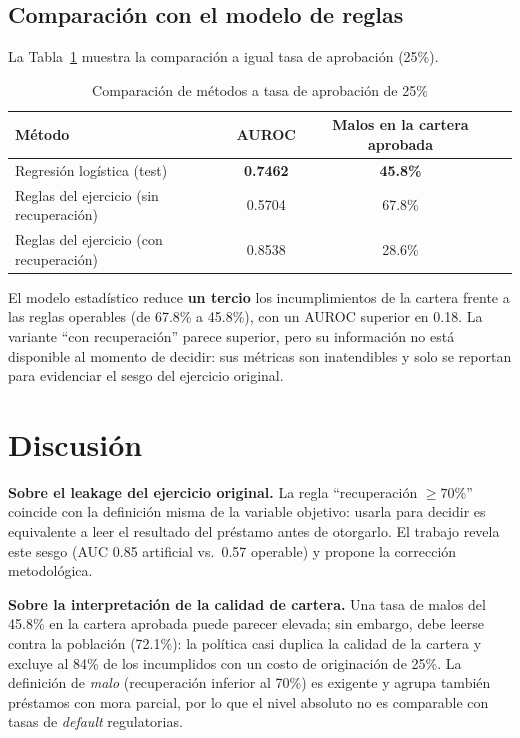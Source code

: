 \documentclass[11pt,letterpaper]{article}
\begin{document}
\subsection{Comparación con el modelo de reglas}

La Tabla~\ref{tab:comp} muestra la comparación a igual tasa de aprobación
(25\%).

\begin{table}[H]
  \centering
  \caption{Comparación de métodos a tasa de aprobación de 25\%}
  \label{tab:comp}
  \small
  \begin{tabular}{lccc}
    \toprule
    Método & AUROC & Malos en la cartera aprobada \\
    \midrule
    Regresión logística (test) & \textbf{0.7462} & \textbf{45.8\%} \\
    Reglas del ejercicio (sin recuperación) & 0.5704 & 67.8\% \\
    Reglas del ejercicio (con recuperación) & 0.8538 & 28.6\% \\
    \bottomrule
  \end{tabular}
\end{table}

El modelo estadístico reduce \textbf{un tercio} los incumplimientos de la
cartera frente a las reglas operables (de 67.8\% a 45.8\%), con un AUROC
superior en 0.18. La variante ``con recuperación'' parece superior, pero su
información no está disponible al momento de decidir: sus métricas son
inatendibles y solo se reportan para evidenciar el sesgo del ejercicio
original.

\section{Discusión}

\textbf{Sobre el leakage del ejercicio original.} La regla ``recuperación
$\geq 70\%$'' coincide con la definición misma de la variable objetivo: usarla
para decidir es equivalente a leer el resultado del préstamo antes de
otorgarlo. El trabajo revela este sesgo (AUC 0.85 artificial vs.\ 0.57
operable) y propone la corrección metodológica.

\textbf{Sobre la interpretación de la calidad de cartera.} Una tasa de malos
del 45.8\% en la cartera aprobada puede parecer elevada; sin embargo, debe
leerse contra la población (72.1\%): la política casi duplica la calidad de la
cartera y excluye al 84\% de los incumplidos con un costo de originación de
25\%. La definición de \emph{malo} (recuperación inferior al 70\%) es exigente
y agrupa también préstamos con mora parcial, por lo que el nivel absoluto no es
comparable con tasas de \emph{default} regulatorias.
\end{document}
